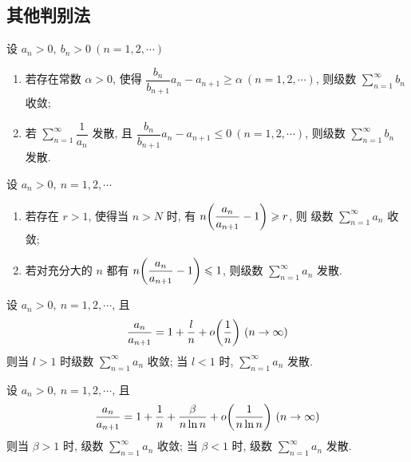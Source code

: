 \subsection{其他判别法}

\begin{theorem}
    设 $a_n>0,~b_n>0~(n=1,2, \cdots )$\begin{enumerate}[label=(\arabic{*})]
        \item 若存在常数 $\alpha>0$, 使得 $\dfrac{b_n}{b_{n+1}}a_n-a_{n+1}\geqslant \alpha~(n=1,2, \cdots )$, 则级数 $\displaystyle \sum_{n=1}^{\infty}b_n$ 收敛;
        \item 若 $\displaystyle \sum_{n=1}^{\infty}\dfrac{1}{a_n}$ 发散, 且 $\dfrac{b_n}{b_{n+1}}a_n-a_{n+1}\leqslant 0~(n=1,2, \cdots )$, 则级数 $\displaystyle \sum_{n=1}^{\infty}b_n$ 发散.
    \end{enumerate}
\end{theorem}

\begin{theorem}
    设 $a_n>0,~n=1,2, \cdots $\begin{enumerate}[label=(\arabic{*})]
        \item 若存在 $r>1$, 使得当 $n>N$ 时, 有 $n\qty(\dfrac{a_n}{a_{n+1}}-1)\geqslant r$, 则 级数 $\displaystyle \sum_{n=1}^{\infty}a_n$ 收敛;
        \item 若对充分大的 $n$ 都有 $n\qty(\dfrac{a_n}{a_{n+1}}-1)\leqslant 1$, 则级数 $\displaystyle \sum_{n=1}^{\infty}a_n$ 发散.
    \end{enumerate}
\end{theorem}

\begin{theorem}
    设 $a_n>0,~n=1,2, \cdots $, 且 $$\dfrac{a_n}{a_{n+1}}=1+\dfrac{l}{n}+o\qty(\dfrac{1}{n}) ~(n\to \infty)$$ 则当 $l>1$ 时级数 $\displaystyle \sum_{n=1}^{\infty} a_n$ 收敛; 当 $l<1$ 时, $\displaystyle \sum_{n=1}^{\infty} a_n$ 发散.
\end{theorem}

\begin{theorem}
    设 $a_n>0,~n=1,2, \cdots $, 且 $$
        \dfrac{a_n}{a_{n+1}}=1+\dfrac{1}{n}+\dfrac{\beta}{n\ln n}+o\qty(\dfrac{1}{n\ln n})~(n\to \infty)
    $$
    则当 $\beta>1$ 时, 级数 $\displaystyle \sum_{n=1}^{\infty} a_n$ 收敛; 当 $\beta<1$ 时, 级数 $\displaystyle \sum_{n=1}^{\infty} a_n$ 发散.
\end{theorem}

